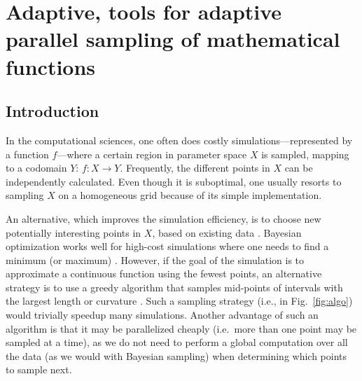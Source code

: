 \chapter{Adaptive, tools for adaptive parallel sampling of mathematical functions}
\label{ch:adaptive}

\newpage
\noindent

\section{Introduction}


In the computational sciences, one often does costly simulations---represented by a function $f$---where a certain region in parameter space $X$ is sampled, mapping to a codomain $Y$: $f \colon X \to Y$.
Frequently, the different points in $X$ can be independently calculated.
Even though it is suboptimal, one usually resorts to sampling $X$ on a homogeneous grid because of its simple implementation.


An alternative, which improves the simulation efficiency, is to choose new potentially interesting points in $X$, based on existing data \cite{Gramacy2004, Figueiredo1995, Castro2008, Chen2017}.
Bayesian optimization works well for high-cost simulations where one needs to find a minimum (or maximum) \cite{Takhtaganov2018}.
However, if the goal of the simulation is to approximate a continuous function using the fewest points, an alternative strategy is to use a greedy algorithm that samples mid-points of intervals with the largest length or curvature \cite{Wolfram2011}.
Such a sampling strategy (i.e., in Fig.~\ref{fig:algo}) would trivially speedup many simulations.
Another advantage of such an algorithm is that it may be parallelized cheaply (i.e.~more than one point may be sampled at a time), as we do not need to perform a global computation over all the data (as we would with Bayesian sampling) when determining which points to sample next.

